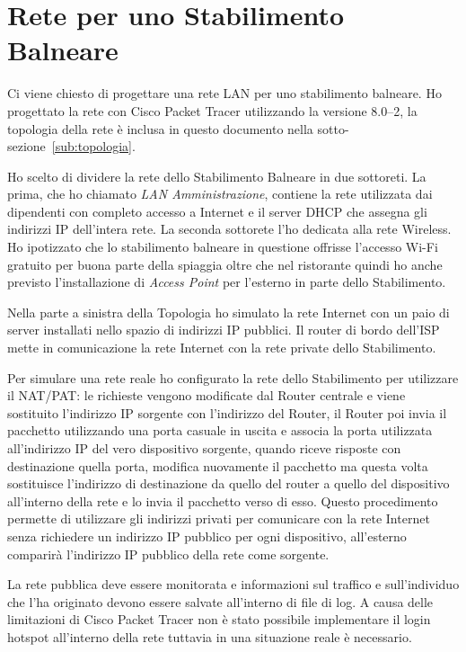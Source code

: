 \newpage
\section{Rete per uno Stabilimento Balneare}%
\label{sec:rete}

Ci viene chiesto di progettare una rete LAN per uno stabilimento balneare. Ho progettato la rete con Cisco Packet Tracer utilizzando la versione 8.0--2, la topologia della rete \`e inclusa in questo documento nella sotto-sezione~\ref{sub:topologia}.

Ho scelto di dividere la rete dello Stabilimento Balneare in due sottoreti. La prima, che ho chiamato \emph{LAN Amministrazione}, contiene la rete utilizzata dai dipendenti con completo accesso a Internet e il server DHCP che assegna gli indirizzi IP dell'intera rete. La seconda sottorete l'ho dedicata alla rete Wireless. Ho ipotizzato che lo stabilimento balneare in questione offrisse l'accesso Wi-Fi gratuito per buona parte della spiaggia oltre che nel ristorante quindi ho anche previsto l'installazione di \emph{Access Point} per l'esterno in parte dello Stabilimento.

Nella parte a sinistra della Topologia ho simulato la rete Internet con un paio di server installati nello spazio di indirizzi IP pubblici. Il router di bordo dell'ISP mette in comunicazione la rete Internet con la rete private dello Stabilimento.

Per simulare una rete reale ho configurato la rete dello Stabilimento per utilizzare il NAT/PAT\@: le richieste vengono modificate dal Router centrale e viene sostituito l'indirizzo IP sorgente con l'indirizzo del Router, il Router poi invia il pacchetto utilizzando una porta casuale in uscita e associa la porta utilizzata all'indirizzo IP del vero dispositivo sorgente, quando riceve risposte con destinazione quella porta, modifica nuovamente il pacchetto ma questa volta sostituisce l'indirizzo di destinazione da quello del router a quello del dispositivo all'interno della rete e lo invia il pacchetto verso di esso. Questo procedimento permette di utilizzare gli indirizzi privati per comunicare con la rete Internet senza richiedere un indirizzo IP pubblico per ogni dispositivo, all'esterno comparir\`a l'indirizzo IP pubblico della rete come sorgente.

La rete pubblica deve essere monitorata e informazioni sul traffico e sull'individuo che l'ha originato devono essere salvate all'interno di file di log. A causa delle limitazioni di Cisco Packet Tracer non \`e stato possibile implementare il login hotspot all'interno della rete tuttavia in una situazione reale \`e necessario.

